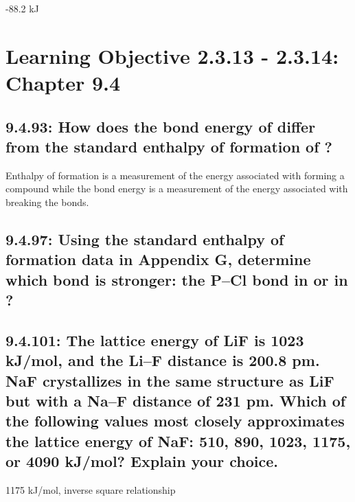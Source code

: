 \documentclass[11pt, letterpaper]{article}
\begin{document}
-88.2 kJ

\section*{Learning Objective 2.3.13 - 2.3.14: Chapter 9.4}


\subsection*{9.4.93: How does the bond energy of  differ 
from the standard enthalpy of formation of ?}

Enthalpy of formation is a measurement of the energy associated with forming a compound while
the bond energy is a measurement of the energy associated with breaking the bonds.

\subsection*{9.4.97: Using the standard enthalpy of formation data in Appendix G, 
determine which bond is stronger: the P–Cl bond in  or in ?}



\subsection*{9.4.101: The lattice energy of LiF is 1023 kJ/mol, and 
the Li–F distance is 200.8 pm. NaF crystallizes in the same structure as 
LiF but with a Na–F distance of 231 pm. Which of the following values most 
closely approximates the lattice energy of NaF: 510, 890, 1023, 1175, or 4090 kJ/mol? 
Explain your choice.}

1175 kJ/mol, inverse square relationship
\end{document}
